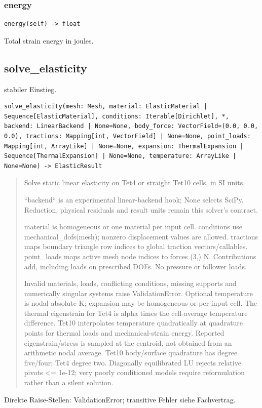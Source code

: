 \subsubsection*{energy}
\begin{lstlisting}
energy(self) -> float
\end{lstlisting}
Total strain energy in joules.
\subsection{solve\_elasticity}
stabiler Einstieg.
\begin{lstlisting}
solve_elasticity(mesh: Mesh, material: ElasticMaterial | Sequence[ElasticMaterial], conditions: Iterable[Dirichlet], *, backend: LinearBackend | None=None, body_force: VectorField=(0.0, 0.0, 0.0), tractions: Mapping[int, VectorField] | None=None, point_loads: Mapping[int, ArrayLike] | None=None, expansion: ThermalExpansion | Sequence[ThermalExpansion] | None=None, temperature: ArrayLike | None=None) -> ElasticResult
\end{lstlisting}
\begin{quote}
Solve static linear elasticity on Tet4 or straight Tet10 cells, in SI units.\par ``backend`` is an experimental linear-backend hook; None selects SciPy. Reduction, physical residuals and result units remain this solver's contract.\par material is homogeneous or one material per input cell. conditions use mechanical\_dofs(mesh); nonzero displacement values are allowed. tractions maps boundary triangle row indices to global traction vectors/callables. point\_loads maps active mesh node indices to forces (3,) N. Contributions add, including loads on prescribed DOFs. No pressure or follower loads.\par Invalid materials, loads, conflicting conditions, missing supports and numerically singular systems raise ValidationError. Optional temperature is nodal absolute K; expansion may be homogeneous or per input cell. The thermal eigenstrain for Tet4 is alpha times the cell-average temperature difference. Tet10 interpolates temperature quadratically at quadrature points for thermal loads and mechanical-strain energy. Reported eigenstrain/stress is sampled at the centroid, not obtained from an arithmetic nodal average. Tet10 body/surface quadrature has degree five/four; Tet4 degree two. Diagonally equilibrated LU rejects relative pivots <= 1e-12; very poorly conditioned models require reformulation rather than a silent solution.
\end{quote}
Direkte Raise-Stellen: ValidationError; transitive Fehler siehe Fachvertrag.
